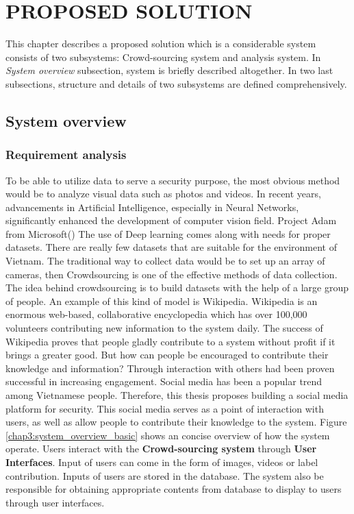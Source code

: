 \chapter{PROPOSED SOLUTION}
\label{chap:solution}

This chapter describes a proposed solution which is a considerable system consists of two subsystems: Crowd-sourcing system and  analysis system. In \textit{System overview} subsection, system is briefly described altogether. In two last subsections, structure and details of two subsystems are defined comprehensively.

\section{System overview}
\subsection{Requirement analysis}
To be able to utilize data to serve a security purpose, the most obvious method would be to analyze visual data such as photos and videos.  In recent years, advancements in Artificial Intelligence, especially in Neural Networks, significantly enhanced the development of computer vision field. Project Adam from Microsoft() The use of Deep learning comes along with needs for proper datasets. There are really few datasets that are suitable for the environment of Vietnam. 
The traditional way to collect data would be to set up an array of cameras, then
Crowdsourcing is one of the effective methods of data collection. The idea behind crowdsourcing is to build datasets with the help of a large group of people. An example of this kind of model is Wikipedia. Wikipedia is an enormous web-based, collaborative encyclopedia which has over 100,000 volunteers contributing new information to the system daily. The success of Wikipedia proves that people gladly contribute to a system without profit if it brings a greater good. 
But how can people be encouraged to contribute their knowledge and information? Through interaction with others had been proven successful in increasing engagement. Social media has been a popular trend among Vietnamese people. Therefore, this thesis proposes building a social media platform for security. This social media serves as a point of interaction with users, as well as allow people to contribute their knowledge to the system.
Figure \ref{chap3:system_overview_basic} shows an concise overview of how the system operate. Users interact with the \textbf{Crowd-sourcing system} through \textbf{User Interfaces}. Input of users can come in the form of images, videos or label contribution. Inputs of users are stored in the database. The system also be responsible for obtaining appropriate contents from database to display to users through user interfaces.
